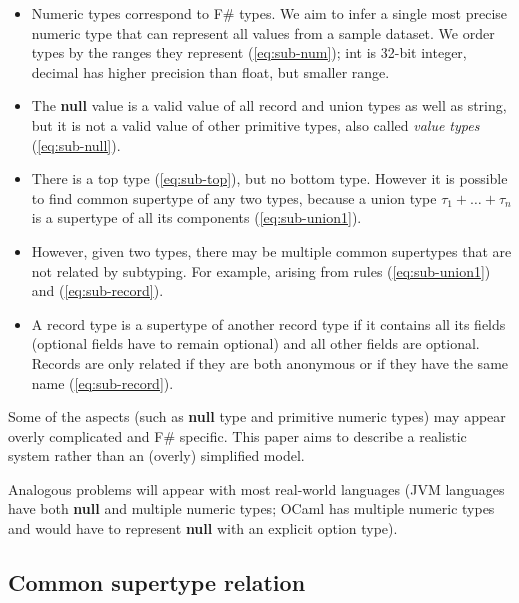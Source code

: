 \documentclass[10pt]{sigplanconf}
\newcommand{\kvd}[1]{\textbf{\sffamily #1}}
\newcommand{\ident}[1]{\textnormal{\sffamily #1}}
\begin{document}
\begin{itemize}
\item Numeric types correspond to F\# types. We aim to infer a single most precise numeric type that 
  can represent all values from a sample dataset. We order types by the ranges they represent (\ref{eq:sub-num});
  \ident{int} is 32-bit integer, \ident{decimal} has higher precision than \ident{float},
  but smaller range. 

\item The \kvd{null} value is a valid value of all record and union types as well as \ident{string}, but
  it is not a valid value of other primitive types, also called \emph{value types} (\ref{eq:sub-null}).

\item There is a top type (\ref{eq:sub-top}), but no bottom type. However it is possible to find common 
  supertype of any two types, because a union type $\tau_1 + \ldots + \tau_n$ is a supertype of all its 
  components (\ref{eq:sub-union1}).

\item However, given two types, there may be multiple common supertypes that are not related by
  subtyping. For example, arising from rules (\ref{eq:sub-union1}) and (\ref{eq:sub-record}). 

\item A record type is a supertype of another record type if it contains all its fields (optional fields
  have to remain optional) and all other fields are optional. Records are only related if they are both 
  anonymous or if they have the same name (\ref{eq:sub-record}).
\end{itemize}

\noindent
Some of the aspects (such as \kvd{null} type and primitive numeric types) may appear overly complicated
and F\# specific. This paper aims to describe a realistic system rather than an (overly) simplified 
model. 

Analogous problems will appear with most real-world languages (JVM languages have both \kvd{null}
and multiple numeric types; OCaml has multiple numeric types and would have to represent \kvd{null} with 
an explicit option type).


\subsection{Common supertype relation}
\label{sec:inference-commonsuper}
\end{document}
